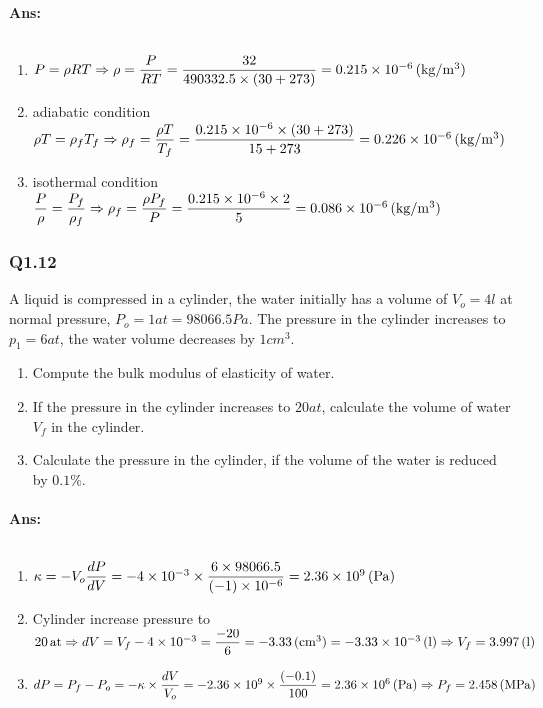 \paragraph{Ans:}$ $
\begin{enumerate}
	\item $ P=\rho R T\Rightarrow\rho = \dfrac{P}{RT}=\dfrac{32}{490332.5\times(30+273)} = 0.215\times10^{-6}\, (\mathrm{kg/m^3}) $
	\item adiabatic condition\\ $  \rho T = \rho_f T_f \Rightarrow \rho_f = \dfrac{\rho T}{T_f} = \dfrac{0.215\times10^{-6}\times(30+273)}{15+273}=0.226\times10^{-6}\, (\mathrm{kg/m^3})$
	\item isothermal condition\\ $  \dfrac{P}{\rho}=\dfrac{P_f}{\rho_f}\Rightarrow\rho_f = \dfrac{\rho P_f}{P} = \dfrac{0.215\times10^{-6}\times2}{5}=0.086\times10^{-6}\, (\mathrm{kg/m^3})$ 
\end{enumerate}
\subsubsection{Q1.12}
A liquid is compressed in a cylinder, the water initially has a volume of $ V_o=4\unit{l} $ at normal pressure, $ P_o=1\unit{at}=98066.5\unit{Pa} $. The pressure in the cylinder increases to $ p_1=6\unit{at} $, the water volume decreases by $ 1\unit{cm^3} $.
\begin{enumerate}
	\item Compute the bulk modulus of elasticity of water.
	\item If the pressure in the cylinder increases to $ 20\unit{at} $, calculate the volume of water $ V_f $ in the cylinder.
	\item Calculate the pressure in the cylinder, if the volume of the water is reduced by $ 0.1\% $.
\end{enumerate}
\paragraph{Ans:}$ $
\begin{enumerate}
	\item $ \kappa = -V_o\dfrac{dP}{dV} = -4\times10^{-3}\times\dfrac{6\times98066.5}{(-1)\times10^{-6}}= 2.36\times10^9\, (\mathrm{Pa})$
	\item Cylinder increase pressure to $ 20\, \mathrm{at}\\ \Rightarrow dV = V_f - 4\times10^{-3}=\dfrac{-20}{6}=-3.33\, (\mathrm{cm^3})=-3.33\times10^{-3}\, (\mathrm{l})\\
	\Rightarrow V_f = 3.997\, (\mathrm{l})$
	\item $ dP =P_f-P_o= -\kappa\times\dfrac{dV}{V_o} = -2.36\times10^9\times\dfrac{(-0.1)}{100}=2.36\times10^6\, (\mathrm{Pa})\\
	\Rightarrow P_f = 2.458\, (\mathrm{MPa})$
\end{enumerate}
